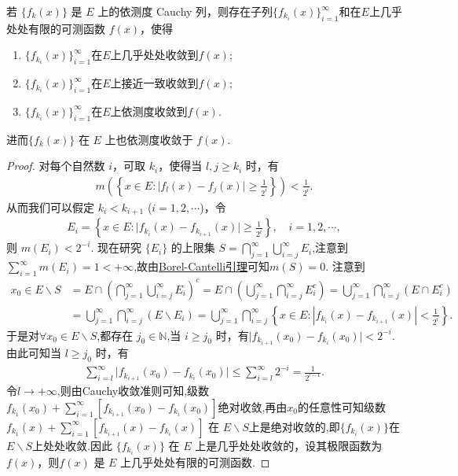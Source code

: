 \documentclass[../../main.tex]{subfiles}%
\begin{document}
\begin{theorem}\label{theorem:定理3.16}
若 $\{f_k(x)\}$ 是 $E$ 上的依测度 Cauchy 列，则存在子列$\{f_{k_i}(x)\}_{i=1}^{\infty}$和在$E$上几乎处处有限的可测函数 $f(x)$，使得
\begin{enumerate}[(1)]
\item $\{f_{k_i}(x)\}_{i=1}^{\infty}$在$E$上几乎处处收敛到$f(x)$;

\item $\{f_{k_i}(x)\}_{i=1}^{\infty}$在$E$上接近一致收敛到$f(x)$;

\item $\{f_{k_i}(x)\}_{i=1}^{\infty}$在$E$上依测度收敛到$f(x)$.
\end{enumerate}
进而$\{f_k(x)\}$ 在 $E$ 上也依测度收敛于 $f(x)$.
\end{theorem}
\begin{proof}
对每个自然数 $i$，可取 $k_i$，使得当 $l,j\geqslant k_i$ 时，有
\begin{align*}
m\left(\left\{x\in E:\vert f_l(x)-f_j(x)\vert\geqslant\frac{1}{2^i}\right\}\right)<\frac{1}{2^i}.
\end{align*}
从而我们可以假定 $k_i<k_{i + 1}$ ($i = 1,2,\cdots$)，令
\begin{align*}
E_i=\left\{x\in E:\vert f_{k_i}(x)-f_{k_{i + 1}}(x)\vert\geqslant\frac{1}{2^i}\right\},\quad i = 1,2,\cdots,
\end{align*}
则 $m(E_i)<2^{-i}$. 现在研究 $\{E_i\}$ 的上限集 $S = \bigcap_{j = 1}^{\infty}\bigcup_{i = j}^{\infty}E_i$,注意到$\sum_{i = 1}^{\infty}m(E_i)=1<+\infty$,故由\hyperref[theorem:Borel-Cantelli引理]{Borel-Cantelli引理}可知$m(S)=0$. 注意到
\begin{align*}
x_0\in E\backslash S&=E\cap \left( \bigcap_{j=1}^{\infty}{\bigcup_{i=j}^{\infty}{E_i}} \right) ^c=E\cap \left( \bigcup_{j=1}^{\infty}{\bigcap_{i=j}^{\infty}{E_{i}^{c}}} \right) =\bigcup_{j=1}^{\infty}{\bigcap_{i=j}^{\infty}{\left( E\cap E_{i}^{c} \right)}}
\\
&=\bigcup_{j=1}^{\infty}{\bigcap_{i=j}^{\infty}{\left( E\backslash E_i \right)}}=\bigcup_{j=1}^{\infty}{\bigcap_{i=j}^{\infty}{\left\{ x\in E:\left| f_{k_i}\left( x \right) -f_{k_{i+1}}\left( x \right) \right|<\frac{1}{2^i} \right\}}.}
\end{align*}
于是对$\forall x_0\in E\backslash S$,都存在 $j_0\in \mathbb{N}$,当 $i\geqslant j_0$ 时，有$\vert f_{k_{i + 1}}(x_0)-f_{k_i}(x_0)\vert<2^{-i}$. 由此可知当 $l\geqslant j_0$ 时，有
\begin{align*}
\sum_{i = l}^{\infty}\vert f_{k_{i + 1}}(x_0)-f_{k_i}(x_0)\vert\leqslant \sum_{i=l}^{\infty}{2^{-i}} = \frac{1}{2^{l - 1}}.
\end{align*}
令$l\to +\infty$,则由Cauchy收敛准则可知,级数$f_{k_1}(x_0)+\sum_{i=1}^{\infty}[f_{k_{i+1}}(x_0)-f_{k_i}(x_0)]$绝对收敛,再由$x_0$的任意性可知级数$f_{k_1}(x)+\sum_{i = 1}^{\infty}[f_{k_{i + 1}}(x)-f_{k_i}(x)]$ 在 $E\backslash S$上是绝对收敛的,即$\{f_{k_i}(x)\}$在$E\backslash S$上处处收敛.因此 $\{f_{k_i}(x)\}$ 在 $E$ 上是几乎处处收敛的，设其极限函数为 $f(x)$，则$f(x)$ 是 $E$ 上几乎处处有限的可测函数.


\end{proof}
\end{document}
